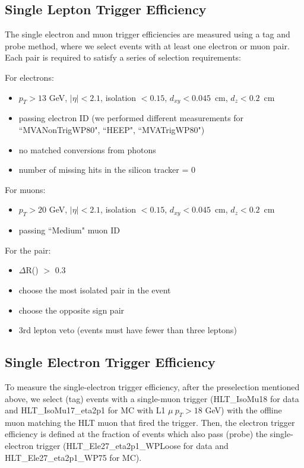 \subsection{Single Lepton Trigger Efficiency}\label{sec:lepTrigger}
The single electron and muon trigger efficiencies are measured
using a tag and probe method, where we select events with at 
least one electron or muon pair. Each pair is required to satisfy a series of selection requirements:

For electrons:
\begin{itemize}
  \item $p_T > 13$ GeV, $|\eta| < 2.1$, isolation $< 0.15$, $d_{xy}<0.045$~cm, $d_{z}<0.2$~cm
  \item passing electron ID (we performed different measurements for ``MVANonTrigWP80", ``HEEP", ``MVATrigWP80")
  \item no matched conversions from photons
  \item number of missing hits in the silicon tracker = 0
\end{itemize}

For muons:
\begin{itemize}
  \item $p_T > 20$ GeV, $|\eta| < 2.1$, isolation $< 0.15$, $d_{xy}<0.045$~cm, $d_{z}<0.2$~cm
  \item passing ``Medium" muon ID
\end{itemize}

For the pair:
\begin{itemize}
  \item $\Delta$R(\emu) $>$ 0.3
  \item choose the most isolated pair in the event
  \item choose the opposite sign pair
  \item 3rd lepton veto (events must have fewer than three leptons)
\end{itemize}

\subsection{Single Electron Trigger Efficiency}\label{sec:eleTrigger}
To measure the single-electron trigger efficiency, after the
preselection mentioned above, we select (tag) events with a
single-muon trigger (HLT\_IsoMu18 for data and HLT\_IsoMu17\_eta2p1
for MC with L1 $\mu~p_{T} > 18$ GeV) with the offline muon matching
the HLT muon that fired the trigger.  Then, the electron trigger efficiency is
defined at the fraction of events which also pass (probe) the
single-electron trigger (HLT\_Ele27\_eta2p1\_WPLoose for data and
HLT\_Ele27\_eta2p1\_WP75 for MC).

